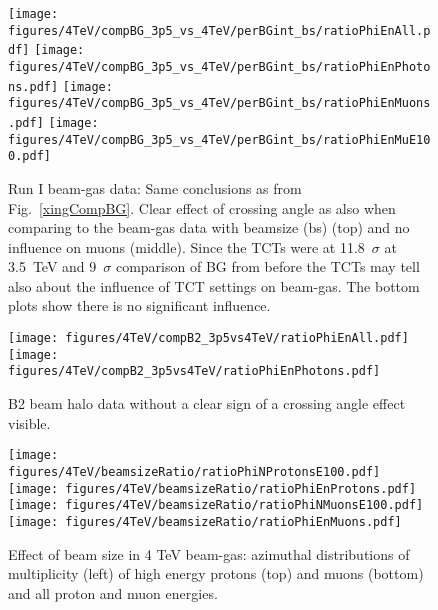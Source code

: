 \begin{figure}
\begin{center}
  \texttt{[image: figures/4TeV/compBG\_3p5\_vs\_4TeV/perBGint\_bs/ratioPhiEnAll.pdf]}
  \texttt{[image: figures/4TeV/compBG\_3p5\_vs\_4TeV/perBGint\_bs/ratioPhiEnPhotons.pdf]}
  \texttt{[image: figures/4TeV/compBG\_3p5\_vs\_4TeV/perBGint\_bs/ratioPhiEnMuons.pdf]}
  \texttt{[image: figures/4TeV/compBG\_3p5\_vs\_4TeV/perBGint\_bs/ratioPhiEnMuE100.pdf]}
\end{center}
\vspace{-0.6cm}
 \caption{Run I beam-gas data: Same conclusions as from Fig.~\ref{xingCompBG}. Clear effect of crossing angle as also when comparing to the beam-gas data with beamsize (bs) (top) and no influence on muons (middle). Since the TCTs were at 11.8~$\sigma$ at 3.5~TeV and 9~$\sigma$ comparison of BG from before the TCTs may tell also about the influence of TCT settings on beam-gas. The bottom plots show there is no significant influence.
  \label{xingCompBG2}}
\end{figure}

\begin{figure}
  \begin{center}
    \texttt{[image: figures/4TeV/compB2\_3p5vs4TeV/ratioPhiEnAll.pdf]}
    \texttt{[image: figures/4TeV/compB2\_3p5vs4TeV/ratioPhiEnPhotons.pdf]}
  \end{center}
  \vspace{-0.6cm}
  \caption{B2 beam halo data without a clear sign of a crossing angle effect visible.
    \label{xingCompBHB2}}
\end{figure}

\begin{figure}%
\begin{center}
  \texttt{[image: figures/4TeV/beamsizeRatio/ratioPhiNProtonsE100.pdf]}
  \texttt{[image: figures/4TeV/beamsizeRatio/ratioPhiEnProtons.pdf]}
  \texttt{[image: figures/4TeV/beamsizeRatio/ratioPhiNMuonsE100.pdf]}
  \texttt{[image: figures/4TeV/beamsizeRatio/ratioPhiEnMuons.pdf]}
\end{center}
\vspace{-0.6cm}
 \caption{Effect of beam size in 4 TeV beam-gas: azimuthal distributions of multiplicity (left) of high energy protons (top) and muons (bottom) and all proton and muon energies. 
  \label{bsRatioPhiMP}}
\end{figure}

